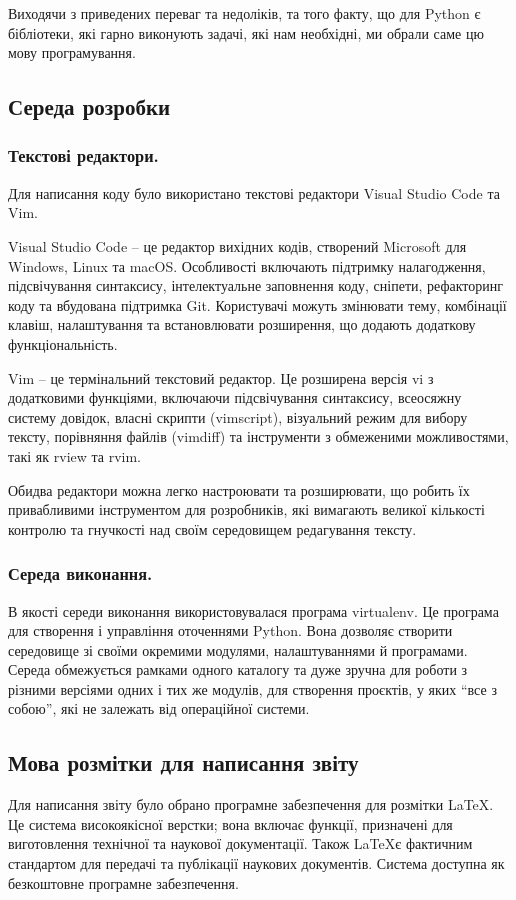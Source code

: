 \documentclass[a4paper,14pt]{extreport}
\begin{document}
        Виходячи з приведених переваг та недоліків, та того факту, що для Python є бібліотеки, які гарно виконують задачі, які нам необхідні, ми обрали саме цю мову програмування.

    \subsection{Середа розробки}
        \subsubsection{Текстові редактори.}
        Для написання коду було використано текстові редактори Visual Studio Code та Vim.

        Visual Studio Code -- це редактор вихідних кодів, створений Microsoft для Windows, Linux та macOS. Особливості включають підтримку налагодження, підсвічування синтаксису, інтелектуальне заповнення коду, сніпети, рефакторинг коду та вбудована підтримка Git. Користувачі можуть змінювати тему, комбінації клавіш, налаштування та встановлювати розширення, що додають додаткову функціональність.

        Vim -- це термінальний текстовий редактор. Це розширена версія vi з додатковими функціями, включаючи підсвічування синтаксису, всеосяжну систему довідок, власні скрипти (vimscript), візуальний режим для вибору тексту, порівняння файлів (vimdiff) та інструменти з обмеженими можливостями, такі як rview та rvim.

        Обидва редактори можна легко настроювати та розширювати, що робить їх привабливими інструментом для розробників, які вимагають великої кількості контролю та гнучкості над своїм середовищем редагування тексту.
        
        \subsubsection{Середа виконання.}
        В якості середи виконання використовувалася програма virtualenv. Це програма для створення і управління оточеннями Python. Вона дозволяє створити середовище зі своїми окремими модулями, налаштуваннями й програмами. Середа обмежується рамками одного каталогу та дуже зручна для роботи з різними версіями одних і тих же модулів, для створення проєктів, у яких ``все з собою'', які не залежать від операційної системи.

\subsection{Мова розмітки для написання звіту}
    Для написання звіту було обрано програмне забезпечення для розмітки \LaTeX. Це система високоякісної верстки; вона включає функції, призначені для виготовлення технічної та наукової документації. Також \LaTeX є фактичним стандартом для передачі та публікації наукових документів. Система доступна як безкоштовне програмне забезпечення.
\end{document}
